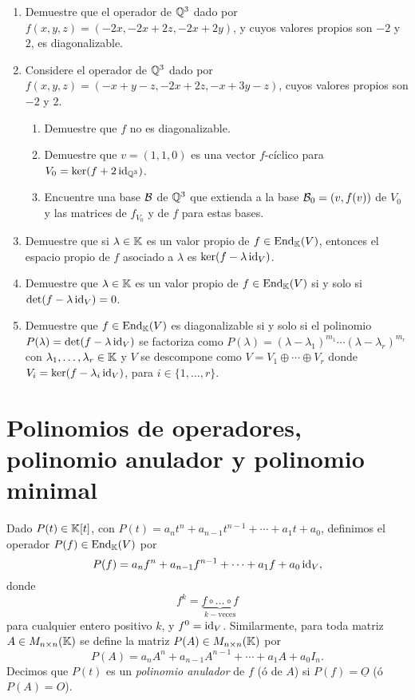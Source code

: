 \begin{enumerate}
  \item\label{ejercicio_diagonalizable} Demuestre que el operador de $\mathbb{Q}^3$ dado por $f(x,y,z)=(-2x,-2x+2z,-2x+2y)$, y cuyos valores propios son $-2$ y $2$, es diagonalizable.
  \item\label{ejercicio_no_diagonalizable} Considere el operador de $\mathbb{Q}^3$ dado por $f(x,y,z)=(-x+y-z,-2x+2z,-x+3y-z)$, cuyos valores propios son $-2$ y $2$.
    \begin{enumerate}
      \item Demuestre que $f$ no es diagonalizable.
      \item Demuestre que $v=(1,1,0)$ es una vector $f$-cíclico para $V_0=\ker(f+2\operatorname{id}_{\mathbb{Q}^3})$.
      \item Encuentre una base $\mathcal{B}$ de $\mathbb{Q}^3$ que extienda a la base $\mathcal{B}_0=(v,f(v))$ de $V_0$ y las matrices de $f_{V_0}$ y de $f$ para estas bases.
    \end{enumerate}
  \item Demuestre que si $\lambda\in\mathbb{K}$ es un valor propio de $f\in\operatorname{End}_{\mathbb{K}}(V)$, entonces el espacio propio de $f$ asociado a $\lambda$ es $\ker(f-\lambda\operatorname{id}_V)$.
  \item Demuestre que $\lambda\in\mathbb{K}$ es un valor propio de $f\in\operatorname{End}_{\mathbb{K}}(V)$ si y solo si $\det(f-\lambda\operatorname{id}_V)=0$.
  \item Demuestre que $f\in\operatorname{End}_{\mathbb{K}}(V)$ es diagonalizable si y solo si el polinomio $P(\lambda)=\det(f-\lambda\operatorname{id}_V)$ se factoriza como $P(\lambda)=(\lambda-\lambda_1)^{m_1}\cdots(\lambda-\lambda_r)^{m_r}$ con $\lambda_1,\ldots,\lambda_r\in\mathbb{K}$ y $V$ se descompone como $V=V_1\oplus\cdots\oplus V_r$ donde $V_i=\ker(f-\lambda_i\operatorname{id}_V)$, para $i\in\{1,\ldots,r\}$.   
\end{enumerate}

\section[Polinomios de operadores]{Polinomios de operadores, polinomio anulador y polinomio minimal}

  \begin{defn}
    Dado $P(t)\in \mathbb{K}[t]$, con $P(t)=a_nt^n+a_{n-1}t^{n-1}+\cdots+a_1t+a_0$, definimos el operador $P(f)\in\operatorname{End}_{\mathbb{K}}(V)$ por
    \[
      P(f)=a_nf^n+a_{n-1}f^{n-1}+\cdots+a_1f+a_0\operatorname{id}_V,
    \]
    donde
    \[
      f^k=\underbrace{f\circ\ldots\circ f}_{k-\textrm{veces}}
    \]
    para cualquier entero positivo $k$, y $f^0=\operatorname{id}_V$. Similarmente, para toda matriz $A\in M_{n\times n}(\mathbb{K})$ se define la matriz $P(A)\in M_{n\times n}(\mathbb{K})$ por
    \[
      P(A)=a_nA^n+a_{n-1}A^{n-1}+\cdots+a_1A+a_0I_n.
    \]
    Decimos que $P(t)$ es un \emph{polinomio anulador} de $f$ (ó de $A$) si $P(f)=\underline{O}$ (ó $P(A)=O$).
  \end{defn}
  
